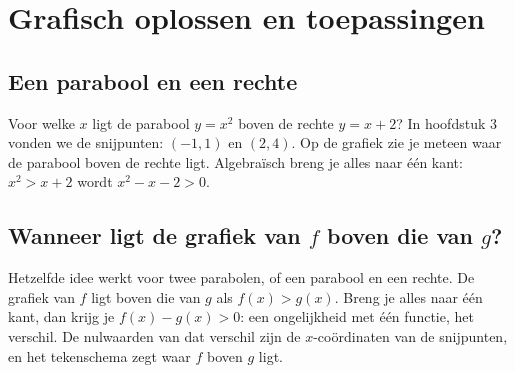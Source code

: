 \section{Grafisch oplossen en toepassingen}

\subsection{Een parabool en een rechte}

Voor welke $x$ ligt de parabool $y = x^2$ boven de rechte $y = x + 2$? In hoofdstuk 3 vonden we de snijpunten: $(-1, 1)$ en $(2, 4)$. Op de grafiek zie je meteen waar de parabool boven de rechte ligt. Algebraïsch breng je alles naar één kant: $x^2 > x + 2$ wordt $x^2 - x - 2 > 0$.


\begin{oefeningen}
\end{oefeningen}

\subsection{Wanneer ligt de grafiek van \texorpdfstring{$f$}{f} boven die van \texorpdfstring{$g$}{g}?}

Hetzelfde idee werkt voor twee parabolen, of een parabool en een rechte. De grafiek van $f$ ligt boven die van $g$ als $f(x) > g(x)$. Breng je alles naar één kant, dan krijg je $f(x) - g(x) > 0$: een ongelijkheid met één functie, het verschil. De nulwaarden van dat verschil zijn de $x$-coördinaten van de snijpunten, en het tekenschema zegt waar $f$ boven $g$ ligt.

